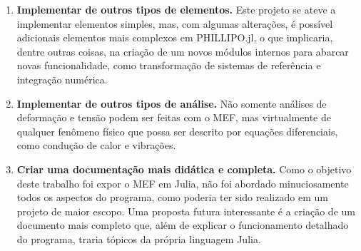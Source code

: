 \begin{enumerate}
    \item \textbf{Implementar de outros tipos de elementos.} Este projeto se ateve a implementar elementos simples, mas, com algumas alterações, é possível adicionais elementos mais complexos em PHILLIPO.jl, o que implicaria, dentre outras coisas, na criação de um novos módulos internos para abarcar novas funcionalidade, como transformação de sistemas de referência e integração numérica.
    \item \textbf{Implementar de outros tipos de análise.} Não somente análises de deformação e tensão podem ser feitas com o MEF, mas virtualmente de qualquer fenômeno físico que possa ser descrito por equações diferenciais, como condução de calor e vibrações.
    \item \textbf{Criar uma documentação mais didática e completa.} Como o objetivo deste trabalho foi expor o MEF em Julia, não foi abordado minuciosamente todos os aspectos do programa, como poderia ter sido realizado em um projeto de maior escopo. Uma proposta futura interessante é a criação de um documento mais completo que, além de explicar o funcionamento detalhado do programa, traria tópicos da própria linguagem Julia.
\end{enumerate}

